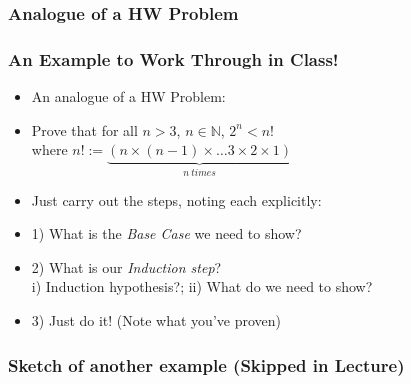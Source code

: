 \subsubsection{Analogue of a HW Problem}

\begin{frame}
\frametitle{An Example to Work Through in Class!}

\begin{itemize}[<+->]

\item An analogue of a HW Problem: 

\item Prove that for all $n>3$, $n\in \mathbb{N}$, $2^n < n!$ \\[2ex] where $n! := \underbrace{(n \times (n-1) \times \ldots 3 \times 2 \times 1)}_{n \ times}$ \\[2ex] 

\item Just carry out the steps, noting each explicitly:

\item[] 1) What is the \emph{Base Case} we need to show?

\item[] 2) What is our \emph{Induction step}? \\ \phantom{vvv} i) Induction hypothesis?; ii) What do we need to show? 

\item[] 3) Just do it! (Note what you've proven)


\end{itemize} 
\end{frame}


\subsubsection{Sketch of another example (Skipped in Lecture)}

